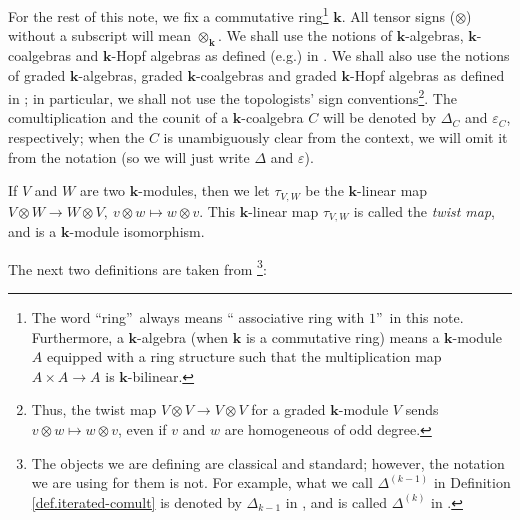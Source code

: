 \documentclass[numbers=enddot,12pt,final,onecolumn,notitlepage,abstracton]{scrartcl}%
\theoremstyle{definition}
\begin{document}
For the rest of this note, we fix a commutative ring\footnote{The word
\textquotedblleft ring\textquotedblright\ always means \textquotedblleft
associative ring with $1$\textquotedblright\ in this note. Furthermore, a
$\mathbf{k}$-algebra (when $\mathbf{k}$ is a commutative ring) means a
$\mathbf{k}$-module $A$ equipped with a ring structure such that the
multiplication map $A\times A\rightarrow A$ is $\mathbf{k}$-bilinear.}
$\mathbf{k}$. All tensor signs ($\otimes$) without a subscript will mean
$\otimes_{\mathbf{k}}$. We shall use the notions of $\mathbf{k}$-algebras,
$\mathbf{k}$-coalgebras and $\mathbf{k}$-Hopf algebras as defined (e.g.) in
\cite[Chapter 1]{Reiner}. We shall also use the notions of graded $\mathbf{k}%
$-algebras, graded $\mathbf{k}$-coalgebras and graded $\mathbf{k}$-Hopf
algebras as defined in \cite[Chapter 1]{Reiner}; in particular, we shall not
use the topologists' sign conventions\footnote{Thus, the twist map $V\otimes
V\rightarrow V\otimes V$ for a graded $\mathbf{k}$-module $V$ sends $v\otimes
w\mapsto w\otimes v$, even if $v$ and $w$ are homogeneous of odd degree.}. The
comultiplication and the counit of a $\mathbf{k}$-coalgebra $C$ will be
denoted by $\Delta_{C}$ and $\varepsilon_{C}$, respectively; when the $C$ is
unambiguously clear from the context, we will omit it from the notation (so we
will just write $\Delta$ and $\varepsilon$).

If $V$ and $W$ are two $\mathbf{k}$-modules, then we let $\tau_{V,W}$ be the
$\mathbf{k}$-linear map $V\otimes W\rightarrow W\otimes V,\ v\otimes w\mapsto
w\otimes v$. This $\mathbf{k}$-linear map $\tau_{V,W}$ is called the
\textit{twist map}, and is a $\mathbf{k}$-module isomorphism.

The next two definitions are taken from \cite[\S 1.4]{Reiner}\footnote{The
objects we are defining are classical and standard; however, the notation we
are using for them is not. For example, what we call $\Delta^{\left(
k-1\right)  }$ in Definition \ref{def.iterated-comult} is denoted by
$\Delta_{k-1}$ in \cite{Sweedler-HA}, and is called $\Delta^{\left(  k\right)
}$ in \cite[\S 7.1]{Fresse-Op}.}:
\end{document}
